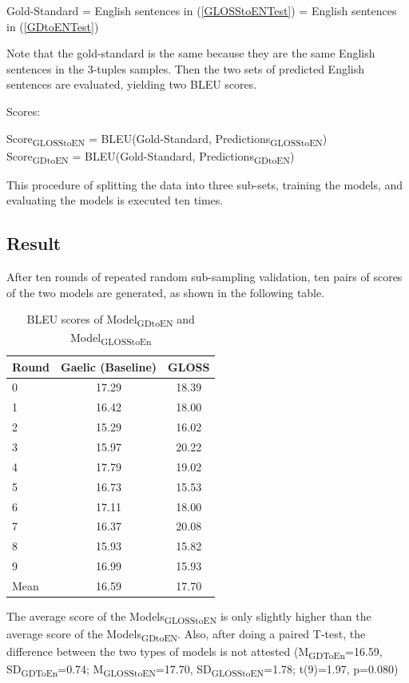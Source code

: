 \documentclass[final]{ua-thesis}
\numberwithin{equation}{section}
\begin{document}
\begin{exe}
\ex Gold-Standard = English sentences in (\ref{GLOSStoENTest}) = English sentences in (\ref{GDtoENTest})
\end{exe}
Note that the gold-standard is the same because they are the same English sentences in the 3-tuples samples. Then the two sets of predicted English sentences are evaluated, yielding two BLEU scores.  

\begin{exe}
\ex Scores: \\
 \begin{xlist}
	\ex Score\textsubscript{GLOSStoEN} = BLEU(Gold-Standard, Predictions\textsubscript{GLOSStoEN}) \\
	\ex Score\textsubscript{GDtoEN} = BLEU(Gold-Standard, Predictions\textsubscript{GDtoEN}) \\
 \end{xlist}
\end{exe}
This procedure of splitting the data into three sub-sets, training the models, and evaluating the models is executed ten times.

\subsection{Result} \label{gdglen_results}
After ten rounds of repeated random sub-sampling validation, ten pairs of scores of the two models are generated, as shown in the following table.
\begin{table}[ht]
\centering
\begin{tabular}{lcc}
  \hline
Round & Gaelic (Baseline) & GLOSS \\ 
  \hline
0 & 17.29 & 18.39 \\ 
  1 & 16.42 & 18.00 \\ 
  2 & 15.29 & 16.02 \\ 
  3 & 15.97 & 20.22 \\ 
  4 & 17.79 & 19.02 \\ 
  5 & 16.73 & 15.53 \\ 
  6 & 17.11 & 18.00 \\ 
  7 & 16.37 & 20.08 \\ 
  8 & 15.93 & 15.82 \\ 
  9 & 16.99 & 15.93 \\ 
   \hline
Mean & 16.59 & 17.70 \\ 
   \hline
\end{tabular}
\caption{BLEU scores of Model\textsubscript{GDtoEN} and Model\textsubscript{GLOSStoEn}} 
\label{Table:GLOSS}
\end{table}
The average score of the Models\textsubscript{GLOSStoEN} is only slightly higher than the average score of the Models\textsubscript{GDtoEN}.
Also, after doing a paired T-test, the difference between the two types of models is not attested
(M\textsubscript{GDToEn}=16.59, SD\textsubscript{GDToEn}=0.74; M\textsubscript{GLOSStoEN}=17.70, SD\textsubscript{GLOSStoEN}=1.78; t(9)=1.97, p=0.080)
\end{document}
